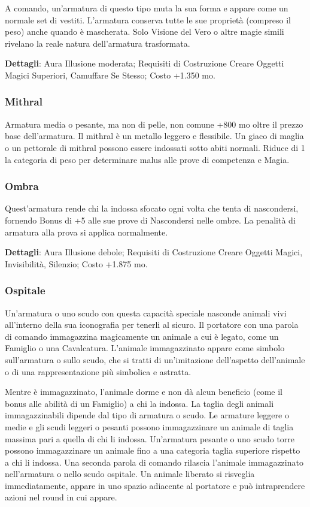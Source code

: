 \begin{multicols}{2}
A comando, un'armatura di questo tipo muta la sua forma e appare come un normale set di vestiti. L'armatura conserva tutte le sue proprietà (compreso il peso) anche quando è mascherata. Solo Visione del Vero o altre magie simili rivelano la reale natura dell'armatura trasformata.

\textbf{Dettagli}: Aura Illusione moderata; Requisiti di Costruzione Creare Oggetti Magici Superiori, Camuffare Se Stesso; Costo +1.350 mo.

\subsubsection*{Mithral}

Armatura media o pesante, ma non di pelle, non comune +800 mo oltre il prezzo base dell'armatura. Il mithral è un metallo leggero e flessibile. Un giaco di maglia o un pettorale di mithral possono essere indossati sotto abiti normali. Riduce di 1 la categoria di peso per determinare malus alle prove di competenza e Magia.

\subsubsection*{Ombra}

Quest'armatura rende chi la indossa sfocato ogni volta che tenta di nascondersi, fornendo Bonus di +5 alle sue prove di Nascondersi nelle ombre. La penalità di armatura alla prova si applica normalmente.

\textbf{Dettagli}: Aura Illusione debole; Requisiti di Costruzione Creare Oggetti Magici, Invisibilità, Silenzio; Costo +1.875 mo.

\subsubsection*{Ospitale}

Un'armatura o uno scudo con questa capacità speciale nasconde animali vivi all'interno della sua iconografia per tenerli al sicuro. Il portatore con una parola di comando immagazzina magicamente un animale a cui è legato, come un Famiglio o una Cavalcatura. L'animale immagazzinato appare come simbolo sull'armatura o sullo scudo, che si tratti di un'imitazione dell'aspetto dell'animale o di una rappresentazione più simbolica e astratta.

Mentre è immagazzinato, l'animale dorme e non dà alcun beneficio (come il bonus alle abilità di un Famiglio) a chi la indossa. La taglia degli animali immagazzinabili dipende dal tipo di armatura o scudo. Le armature leggere o medie e gli scudi leggeri o pesanti possono immagazzinare un animale di taglia massima pari a quella di chi li indossa. Un'armatura pesante o uno scudo torre possono immagazzinare un animale fino a una categoria taglia superiore rispetto a chi li indossa. Una seconda parola di comando rilascia l'animale immagazzinato nell'armatura o nello scudo ospitale. Un animale liberato si risveglia immediatamente, appare in uno spazio adiacente al portatore e può intraprendere azioni nel round in cui appare.


\end{multicols}
